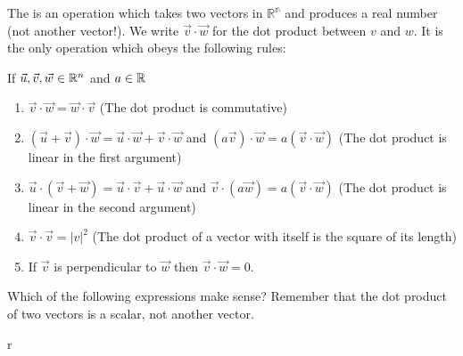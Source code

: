 \documentclass{ximera}
\begin{document}
\begin{definition}
	The  is an operation which takes two vectors in $\mathbb{R^n}$ and produces a real number (not another vector!).   We write $\vec{v} \cdot \vec{w}$ for the dot product between $v$ and $w$. It is the only operation which obeys the following rules:
	
	If $\vec{u},\vec{v},\vec{w} \in \mathbb R^n$ and $a \in \mathbb R$
	
\begin{enumerate}
\item $\vec{v} \cdot \vec{w} = \vec{w} \cdot \vec{v}$ (The dot product is commutative)
			
\item $(\vec{u}+\vec{v})\cdot \vec{w} = \vec{u}\cdot \vec{w} + \vec{v}\cdot \vec{w}$ 	and $(a\vec{v})\cdot \vec{w} = a(\vec{v} \cdot \vec{w})$ (The dot product is linear in the first argument)
			
\item $\vec{u} \cdot (\vec{v}+\vec{w}) = \vec{u}\cdot \vec{v}+ \vec{u}\cdot \vec{w}$ and  $\vec{v} \cdot (a\vec{w}) = a(\vec{v} \cdot  \vec{w})$ (The dot product is linear in the second argument)
			
\item $\vec{v} \cdot \vec{v} = |v|^2$ (The dot product of a vector with itself is the square of its length)
			
\item If  $\vec{v}$ is perpendicular to $\vec{w}$ then $\vec{v} \cdot \vec{w} = 0$.  
\end{enumerate}

\end{definition}

\begin{question}
	Which of the following expressions make sense?  Remember that the dot product of two vectors is a scalar, not another vector.
	
	\begin{selectAll}
		r
	\end{selectAll}
\end{question}
\end{document}
